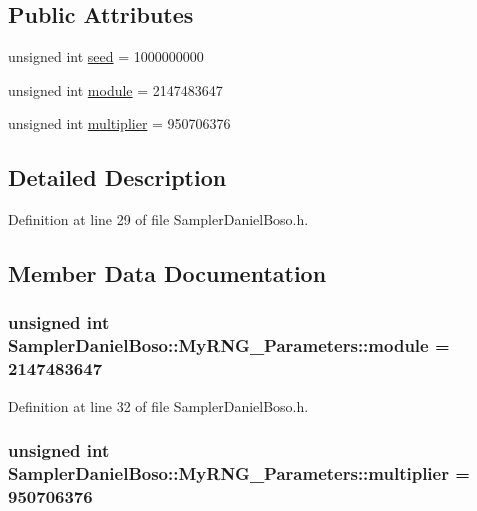 \subsection*{Public Attributes}
\begin{DoxyCompactItemize}
\item 
unsigned int \hyperlink{class_sampler_daniel_boso_1_1_my_r_n_g___parameters_ac0f1bd1a3e22703473e781865e57ac51}{seed} = 1000000000
\item 
unsigned int \hyperlink{class_sampler_daniel_boso_1_1_my_r_n_g___parameters_adf527d7cdda0ff53d11e8fe19ac8cf9e}{module} = 2147483647
\item 
unsigned int \hyperlink{class_sampler_daniel_boso_1_1_my_r_n_g___parameters_ad66991747f14d08ae6aac110456ebe53}{multiplier} = 950706376
\end{DoxyCompactItemize}


\subsection{Detailed Description}


Definition at line 29 of file Sampler\-Daniel\-Boso.\-h.



\subsection{Member Data Documentation}
\hypertarget{class_sampler_daniel_boso_1_1_my_r_n_g___parameters_adf527d7cdda0ff53d11e8fe19ac8cf9e}{
\subsubsection[{module}]{\setlength{\rightskip}{0pt plus 5cm}unsigned int Sampler\-Daniel\-Boso\-::\-My\-R\-N\-G\-\_\-\-Parameters\-::module = 2147483647}}\label{class_sampler_daniel_boso_1_1_my_r_n_g___parameters_adf527d7cdda0ff53d11e8fe19ac8cf9e}


Definition at line 32 of file Sampler\-Daniel\-Boso.\-h.

\hypertarget{class_sampler_daniel_boso_1_1_my_r_n_g___parameters_ad66991747f14d08ae6aac110456ebe53}{
\subsubsection[{multiplier}]{\setlength{\rightskip}{0pt plus 5cm}unsigned int Sampler\-Daniel\-Boso\-::\-My\-R\-N\-G\-\_\-\-Parameters\-::multiplier = 950706376}}\label{class_sampler_daniel_boso_1_1_my_r_n_g___parameters_ad66991747f14d08ae6aac110456ebe53}


